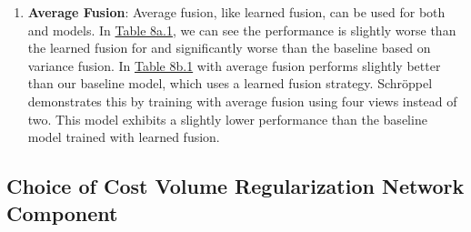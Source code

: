 \begin{enumerate}
    \item \textbf{Average Fusion}\cite{im2019dpsnet}: Average fusion, like learned fusion, can be used for both {\mvsn} and {\rmvd} models. In \hyperref[tab:cvf]{Table 8a.1}, we can see the performance is slightly worse than the learned fusion for {\mvsn} and significantly worse than the baseline based on variance fusion. In \hyperref[tab:cvf]{Table 8b.1} {\rmvd} with average fusion performs slightly better than our baseline model, which uses a learned fusion strategy. Schröppel \etal demonstrates this by training {\rmvd} with average fusion using four views instead of two. This model exhibits a slightly lower performance than the baseline {\rmvd} model trained with learned fusion. \cite{schroeppel2022benchmark}
\end{enumerate}
\subsection{Choice of Cost Volume Regularization Network Component}\label{subsec:cvr}

